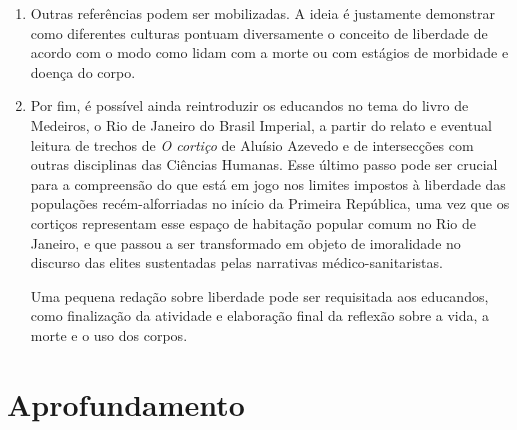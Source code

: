 \documentclass[12pt]{extarticle}
\begin{document}
\begin{enumerate}
\item Outras referências podem ser mobilizadas. A ideia é justamente
demonstrar como diferentes culturas pontuam diversamente o conceito de
liberdade de acordo com o modo como lidam com a morte ou com estágios de
morbidade e doença do corpo.

\item Por fim, é possível ainda reintroduzir os educandos no tema do livro de
Medeiros, o Rio de Janeiro do Brasil Imperial, a partir do relato e
eventual leitura de trechos de \emph{O cortiço} de Aluísio Azevedo e de intersecções 
com outras disciplinas das Ciências Humanas. Esse
último passo pode ser crucial para a compreensão do que está em jogo nos
limites impostos à liberdade das populações recém-alforriadas no início
da Primeira República, uma vez que os cortiços representam esse espaço
de habitação popular comum no Rio de Janeiro, e que passou a ser
transformado em objeto de imoralidade no discurso das elites sustentadas
pelas narrativas médico-sanitaristas.

Uma pequena redação sobre liberdade pode ser requisitada aos
educandos, como finalização da atividade e elaboração final da reflexão
sobre a vida, a morte e o uso dos corpos.
\end{enumerate}

\section{Aprofundamento}

\end{document}

